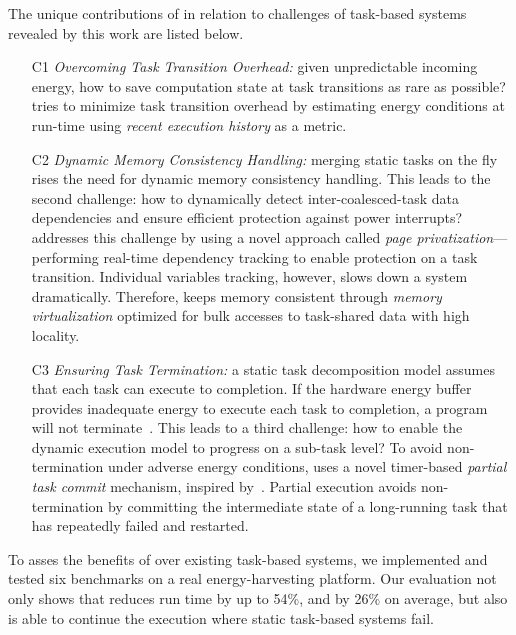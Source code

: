 The unique contributions of \sys in relation to challenges of task-based systems revealed by this work are listed below.

\begin{itemize}

\item[C1] \emph{Overcoming Task Transition Overhead:} given unpredictable incoming energy, how to save computation state at task transitions as rare as possible? \sys tries to minimize task transition overhead by estimating energy conditions at run-time using \emph{recent execution history} as a metric.

\item[C2] \emph{Dynamic Memory Consistency Handling:} merging static tasks on the fly rises  the need for dynamic memory consistency handling. This leads to the second challenge: how to dynamically detect inter-coalesced-task data dependencies and ensure efficient protection against power interrupts? \sys addresses this challenge by using a novel approach called \emph{page privatization}---performing real-time dependency tracking to enable protection on a task transition. Individual variables tracking, however, slows down a system dramatically. Therefore, \sys keeps memory consistent through \emph{memory virtualization} optimized for bulk accesses to task-shared data with high locality.


\item[C3] \emph{Ensuring Task Termination:} a static task decomposition model assumes that each task can execute to completion. If the hardware energy buffer provides inadequate energy to execute each task to completion, a program will not terminate~\cite{cleancut_2018}. This leads to a third challenge: how to enable the dynamic execution model to progress on a sub-task level? To avoid non-termination under adverse energy conditions, \sys uses a novel timer-based {\em partial task commit} mechanism, inspired by~\cite{ratchet}. Partial execution avoids non-termination by committing the intermediate state of a long-running task that has repeatedly failed and restarted.

\end{itemize}

To asses the benefits of \sys over existing task-based systems, we implemented and tested six benchmarks on a real energy-harvesting platform. Our evaluation not only shows that \sys reduces run time by up to 54\%, and by 26\% on average, but also is able to continue the execution where static task-based systems fail.
 
